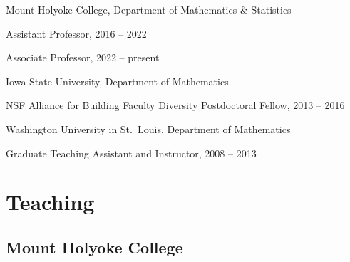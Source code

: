 \documentclass[10pt,letterpaper]{article}
\renewenvironment{itemize}{
  \begin{list}{}{
    \setlength{\leftmargin}{1.5em}
    \setlength{\itemsep}{0.25em}
    \setlength{\parskip}{0pt}
    \setlength{\parsep}{0.25em}
  }
}{
  \end{list}
}
\providecommand{\tightlist}{%
  \setlength{\itemsep}{0pt}\setlength{\parskip}{0pt}}
\let\tightlist\relax
\begin{document}
\begin{itemize}
\tightlist
\item
  Mount Holyoke College, Department of Mathematics \& Statistics

  \begin{itemize}
  \tightlist
  \item
    Assistant Professor, 2016 -- 2022
  \item
    Associate Professor, 2022 -- present
  \end{itemize}
\item
  Iowa State University, Department of Mathematics

  \begin{itemize}
  \tightlist
  \item
    NSF Alliance for Building Faculty Diversity Postdoctoral Fellow,
    2013 -- 2016
  \end{itemize}
\item
  Washington University in St.~Louis, Department of Mathematics

  \begin{itemize}
  \tightlist
  \item
    Graduate Teaching Assistant and Instructor, 2008 -- 2013
  \end{itemize}
\end{itemize}

\hypertarget{teaching}{%
\section*{Teaching}\label{teaching}}

\hypertarget{mount-holyoke-college}{%
\subsection*{Mount Holyoke College}\label{mount-holyoke-college}}
\end{document}
